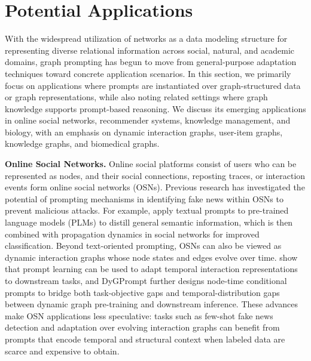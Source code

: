 
\section{Potential Applications}\label{sec:app}
With the widespread utilization of networks as a data modeling structure for representing diverse relational information across social, natural, and academic domains, graph prompting has begun to move from general-purpose adaptation techniques toward concrete application scenarios. In this section, we primarily focus on applications where prompts are instantiated over graph-structured data or graph representations, while also noting related settings where graph knowledge supports prompt-based reasoning. We discuss its emerging applications in online social networks, recommender systems, knowledge management, and biology, with an emphasis on dynamic interaction graphs, user-item graphs, knowledge graphs, and biomedical graphs.


\textbf{Online Social Networks. }
Online social platforms consist of users who can be represented as nodes, and their social connections, reposting traces, or interaction events form online social networks (OSNs). Previous research has investigated the potential of prompting mechanisms in identifying fake news within OSNs to prevent malicious attacks. For example, \citet{wu2023promptandalign} apply textual prompts to pre-trained language models (PLMs) to distill general semantic information, which is then combined with propagation dynamics in social networks for improved classification. Beyond text-oriented prompting, OSNs can also be viewed as dynamic interaction graphs whose node states and edges evolve over time. \citet{chen2024prompt} show that prompt learning can be used to adapt temporal interaction representations to downstream tasks, and DyGPrompt \cite{yu2025dygprompt} further designs node-time conditional prompts to bridge both task-objective gaps and temporal-distribution gaps between dynamic graph pre-training and downstream inference. These advances make OSN applications less speculative: tasks such as few-shot fake news detection and adaptation over evolving interaction graphs can benefit from prompts that encode temporal and structural context when labeled data are scarce and expensive to obtain.



